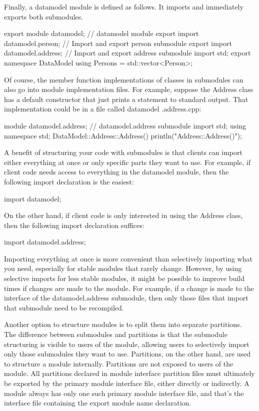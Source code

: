 Finally, a datamodel module is defined as follows. It imports and immediately exports both submodules.

\begin{cpp}
export module datamodel; // datamodel module
export import datamodel.person; // Import and export person submodule
export import datamodel.address; // Import and export address submodule
import std;
export namespace DataModel { using Persons = std::vector<Person>; }
\end{cpp}

Of course, the member function implementations of classes in submodules can also go into module implementation files. For example, suppose the Address class has a default constructor that just prints a statement to standard output. That implementation could be in a file called datamodel .address.cpp:

\begin{cpp}
module datamodel.address; // datamodel.address submodule
import std;
using namespace std;
DataModel::Address::Address() { println("Address::Address()"); }
\end{cpp}

A benefit of structuring your code with submodules is that clients can import either everything at once or only specific parts they want to use. For example, if client code needs access to everything in the datamodel module, then the following import declaration is the easiest:

\begin{cpp}
import datamodel;
\end{cpp}

On the other hand, if client code is only interested in using the Address class, then the following import declaration suffices:

\begin{cpp}
import datamodel.address;
\end{cpp}

Importing everything at once is more convenient than selectively importing what you need, especially for stable modules that rarely change. However, by using selective imports for less stable modules, it might be possible to improve build times if changes are made to the module. For example, if a change is made to the interface of the datamodel.address submodule, then only those files that import that submodule need to be recompiled.


Another option to structure modules is to split them into separate partitions. The difference between submodules and partitions is that the submodule structuring is visible to users of the module, allowing users to selectively import only those submodules they want to use. Partitions, on the other hand, are used to structure a module internally. Partitions are not exposed to users of the module. All partitions declared in module interface partition files must ultimately be exported by the primary module interface file, either directly or indirectly. A module always has only one such primary module interface file, and that’s the interface file containing the export module name declaration.


